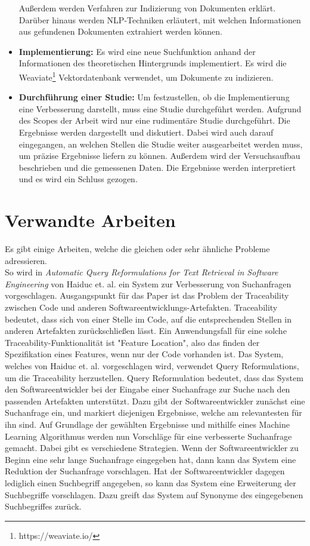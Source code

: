 \begin{itemize}
         Außerdem werden Verfahren zur Indizierung von Dokumenten erklärt.
         Darüber hinaus werden NLP-Techniken erläutert, mit welchen Informationen aus gefundenen Dokumenten extrahiert werden können.
   \item \textbf{Implementierung:}
         Es wird eine neue Suchfunktion anhand der Informationen des theoretischen Hintergrunds implementiert.
         Es wird die Weaviate\footnote{https://weaviate.io/} Vektordatenbank verwendet, um Dokumente zu indizieren.
   \item \textbf{Durchführung einer Studie:}
         Um festzustellen, ob die Implementierung eine Verbesserung darstellt, muss eine Studie durchgeführt werden.
         Aufgrund des Scopes der Arbeit wird nur eine rudimentäre Studie durchgeführt.
         Die Ergebnisse werden dargestellt und diskutiert.
         Dabei wird auch darauf eingegangen, an welchen Stellen die Studie weiter ausgearbeitet werden muss, um präzise Ergebnisse liefern zu können.
         Außerdem wird der Versuchsaufbau beschrieben und die gemessenen Daten.
         Die Ergebnisse werden interpretiert und es wird ein Schluss gezogen.
\end{itemize}

\section{Verwandte Arbeiten}
Es gibt einige Arbeiten, welche die gleichen oder sehr ähnliche Probleme adressieren.\\

So wird in \textit{Automatic Query Reformulations for Text Retrieval in Software Engineering} von Haiduc et. al. ein System zur Verbesserung von Suchanfragen vorgeschlagen.
Ausgangspunkt für das Paper ist das Problem der Traceability zwischen Code und anderen Softwareentwicklungs-Artefakten.
Traceability bedeutet, dass sich von einer Stelle im Code, auf die entsprechenden Stellen in anderen Artefakten zurückschließen lässt.
Ein Anwendungsfall für eine solche Traceability-Funktionalität ist "Feature Location", also das finden der Spezifikation eines Features, wenn nur der Code vorhanden ist.
Das System, welches von Haiduc et. al. vorgeschlagen wird, verwendet Query Reformulations, um die Traceability herzustellen.
Query Reformulation bedeutet, dass das System den Softwareentwickler bei der Eingabe einer Suchanfrage zur Suche nach den passenden Artefakten unterstützt.
Dazu gibt der Softwareentwickler zunächst eine Suchanfrage ein, und markiert diejenigen Ergebnisse, welche am relevantesten für ihn sind.
Auf Grundlage der gewählten Ergebnisse und mithilfe eines Machine Learning Algorithmus werden nun Vorschläge für eine verbesserte Suchanfrage gemacht.
Dabei gibt es verschiedene Strategien.
Wenn der Softwareentwickler zu Beginn eine sehr lange Suchanfrage eingegeben hat, dann kann das System eine Reduktion der Suchanfrage vorschlagen.
Hat der Softwareentwickler dagegen lediglich einen Suchbegriff angegeben, so kann das System eine Erweiterung der Suchbegriffe vorschlagen.
Dazu greift das System auf Synonyme des eingegebenen Suchbegriffes zurück.\cite{Haiduc_Bavota_Marcus_Oliveto_DeLucia_Menzies_2013}\\

